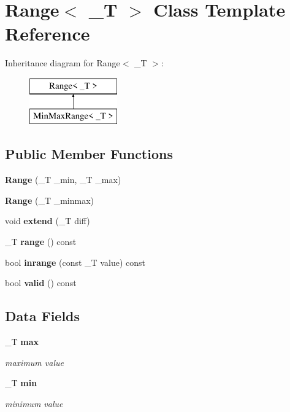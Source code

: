 \section{Range$<$ \-\_\-\-T $>$ Class Template Reference}
\label{classRange}
Inheritance diagram for Range$<$ \-\_\-\-T $>$\-:\begin{figure}[H]
\begin{center}
\leavevmode
\includegraphics[height=2.000000cm]{classRange}
\end{center}
\end{figure}
\subsection*{Public Member Functions}
\begin{DoxyCompactItemize}
\item 
{\bfseries Range} (\-\_\-\-T \-\_\-min, \-\_\-\-T \-\_\-max)\label{classRange_aaa73dd31c0c629a02e214f6db438e5e1}

\item 
{\bfseries Range} (\-\_\-\-T \-\_\-minmax)\label{classRange_a09e1bb3d87e276a48a855a22602ef677}

\item 
void {\bfseries extend} (\-\_\-\-T diff)\label{classRange_ae24bebe307766cef33c471dc8883b7a0}

\item 
\-\_\-\-T {\bfseries range} () const \label{classRange_ad24d5d2bcbcaf468dbc9b639cb66ca2c}

\item 
bool {\bfseries inrange} (const \-\_\-\-T value) const \label{classRange_aa775f3e2c83c494507c17b9938f04a44}

\item 
bool {\bfseries valid} () const \label{classRange_abdc59f930d73c924f28ba23b83b3ac41}

\end{DoxyCompactItemize}
\subsection*{Data Fields}
\begin{DoxyCompactItemize}
\item 
\-\_\-\-T {\bf max}\label{classRange_a3f5b42cf64810fc334f805fd6f146197}

\begin{DoxyCompactList}\small\item\em maximum value \end{DoxyCompactList}\item 
\-\_\-\-T {\bf min}\label{classRange_ab7904596c5b8a52eb5e6671ed8ca942d}

\begin{DoxyCompactList}\small\item\em minimum value \end{DoxyCompactList}\end{DoxyCompactItemize}



